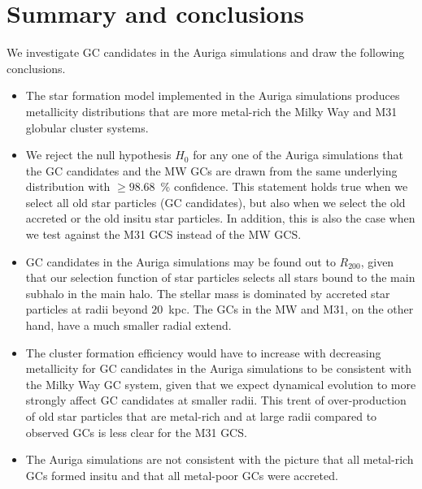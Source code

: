 \documentclass[a4paper,fleqn,usenatbib]{mnras}
\begin{document}
\section{Summary and conclusions}
\label{sec:conclusions}

We investigate GC candidates in the Auriga simulations and draw the following
conclusions.

\begin{itemize}
    \item The star formation model implemented in the Auriga simulations produces
    metallicity distributions that are more metal-rich the Milky Way and M31
    globular cluster systems.

    \item We reject the null hypothesis $H_0$ for any one of the Auriga simulations 
    that the GC candidates and the MW GCs are drawn from the same underlying 
    distribution with $\geq 98.68$~\% confidence. This statement holds true when
    we select all old star particles (GC candidates), but also when we select the 
    old accreted or the old insitu star particles. In addition, this is also
    the case when we test against the M31 GCS instead of the MW GCS.

    \item GC candidates in the Auriga simulations may be found out to $R_{200}$,
    given that our selection function of star particles selects all stars bound
    to the main subhalo in the main halo. The stellar mass is dominated by accreted 
    star particles at radii beyond $20$~kpc. The GCs in the MW and M31, on the 
    other hand, have a much smaller radial extend.

    \item The cluster formation efficiency would have to increase with decreasing
    metallicity for GC candidates in the Auriga simulations to be consistent
    with the Milky Way GC system, given that we expect dynamical evolution to 
    more strongly affect GC candidates at smaller radii. This trent of over-production
    of old star particles that are metal-rich and at large radii compared to 
    observed GCs is less clear for the M31 GCS.

    \item The Auriga simulations are not consistent with the picture that all
    metal-rich GCs formed insitu and that all metal-poor GCs were accreted.

\end{itemize}
\end{document}
